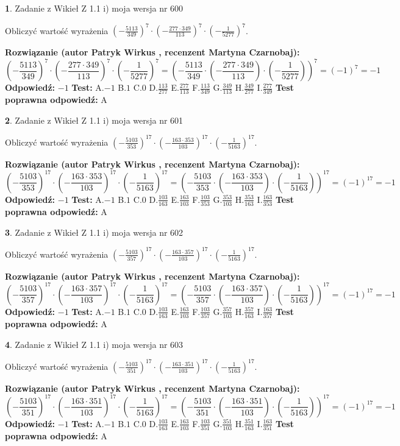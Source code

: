 \documentclass[12pt, a4paper]{article}
\theoremstyle{definition} %
\newtheorem{zad}{}
\newcommand{\zadStart}[1]{\begin{zad}#1\newline}
\newcommand{\zadStop}{\end{zad}}
\newcommand{\rozwStart}[2]{\noindent \textbf{Rozwiązanie (autor #1 , recenzent #2): }\newline}
\newcommand{\rozwStop}{\newline}
\newcommand{\odpStart}{\noindent \textbf{Odpowiedź:}\newline}
\newcommand{\odpStop}{\newline}
\newcommand{\testStart}{\noindent \textbf{Test:}\newline}
\newcommand{\testStop}{\newline}
\newcommand{\kluczStart}{\noindent \textbf{Test poprawna odpowiedź:}\newline}
\newcommand{\kluczStop}{\newline}
\begin{document}
\zadStart{Zadanie z Wikieł Z 1.1 i) moja wersja nr 600}

Obliczyć wartość wyrażenia $(-\frac{5113}{349})^{7} \cdot (-\frac{277 \cdot 349}{113})^{7} \cdot (-\frac{1}{5277})^{7}$.
\zadStop
\rozwStart{Patryk Wirkus}{Martyna Czarnobaj}
$$(-\frac{5113}{349})^{7} \cdot (-\frac{277 \cdot 349}{113})^{7} \cdot (-\frac{1}{5277})^{7} = (-\frac{5113}{349} \cdot (-\frac{277 \cdot 349}{113}) \cdot (-\frac{1}{5277}))^{7} = (-1)^{7} = -1$$
\rozwStop
\odpStart
$-1$
\odpStop
\testStart
A.$-1$ B.$1$ C.$0$ D.$\frac{113}{277}$ E.$\frac{277}{113}$
F.$\frac{113}{349}$ G.$\frac{349}{113}$
H.$\frac{349}{277}$
I.$\frac{277}{349}$
\testStop
\kluczStart
A
\kluczStop



\zadStart{Zadanie z Wikieł Z 1.1 i) moja wersja nr 601}

Obliczyć wartość wyrażenia $(-\frac{5103}{353})^{17} \cdot (-\frac{163 \cdot 353}{103})^{17} \cdot (-\frac{1}{5163})^{17}$.
\zadStop
\rozwStart{Patryk Wirkus}{Martyna Czarnobaj}
$$(-\frac{5103}{353})^{17} \cdot (-\frac{163 \cdot 353}{103})^{17} \cdot (-\frac{1}{5163})^{17} = (-\frac{5103}{353} \cdot (-\frac{163 \cdot 353}{103}) \cdot (-\frac{1}{5163}))^{17} = (-1)^{17} = -1$$
\rozwStop
\odpStart
$-1$
\odpStop
\testStart
A.$-1$ B.$1$ C.$0$ D.$\frac{103}{163}$ E.$\frac{163}{103}$
F.$\frac{103}{353}$ G.$\frac{353}{103}$
H.$\frac{353}{163}$
I.$\frac{163}{353}$
\testStop
\kluczStart
A
\kluczStop



\zadStart{Zadanie z Wikieł Z 1.1 i) moja wersja nr 602}

Obliczyć wartość wyrażenia $(-\frac{5103}{357})^{17} \cdot (-\frac{163 \cdot 357}{103})^{17} \cdot (-\frac{1}{5163})^{17}$.
\zadStop
\rozwStart{Patryk Wirkus}{Martyna Czarnobaj}
$$(-\frac{5103}{357})^{17} \cdot (-\frac{163 \cdot 357}{103})^{17} \cdot (-\frac{1}{5163})^{17} = (-\frac{5103}{357} \cdot (-\frac{163 \cdot 357}{103}) \cdot (-\frac{1}{5163}))^{17} = (-1)^{17} = -1$$
\rozwStop
\odpStart
$-1$
\odpStop
\testStart
A.$-1$ B.$1$ C.$0$ D.$\frac{103}{163}$ E.$\frac{163}{103}$
F.$\frac{103}{357}$ G.$\frac{357}{103}$
H.$\frac{357}{163}$
I.$\frac{163}{357}$
\testStop
\kluczStart
A
\kluczStop



\zadStart{Zadanie z Wikieł Z 1.1 i) moja wersja nr 603}

Obliczyć wartość wyrażenia $(-\frac{5103}{351})^{17} \cdot (-\frac{163 \cdot 351}{103})^{17} \cdot (-\frac{1}{5163})^{17}$.
\zadStop
\rozwStart{Patryk Wirkus}{Martyna Czarnobaj}
$$(-\frac{5103}{351})^{17} \cdot (-\frac{163 \cdot 351}{103})^{17} \cdot (-\frac{1}{5163})^{17} = (-\frac{5103}{351} \cdot (-\frac{163 \cdot 351}{103}) \cdot (-\frac{1}{5163}))^{17} = (-1)^{17} = -1$$
\rozwStop
\odpStart
$-1$
\odpStop
\testStart
A.$-1$ B.$1$ C.$0$ D.$\frac{103}{163}$ E.$\frac{163}{103}$
F.$\frac{103}{351}$ G.$\frac{351}{103}$
H.$\frac{351}{163}$
I.$\frac{163}{351}$
\testStop
\kluczStart
A
\kluczStop
\end{document}
